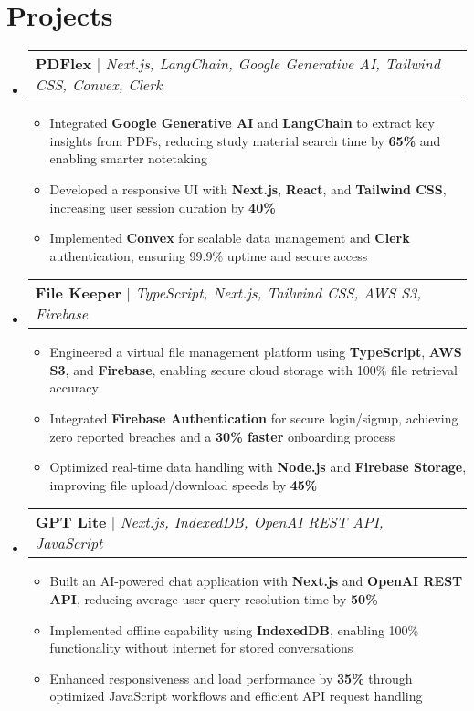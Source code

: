 \documentclass[letterpaper,11pt]{article}
\makeatletter
\newcommand{\resumeItem}[1]{
  \item\small{
    {#1 \vspace{0pt}}
  }
}
\newcommand{\resumeProjectHeading}[2]{
    \item
    \begin{tabular*}{1.001\textwidth}{l@{\extracolsep{\fill}}r}
      \small#1 & \textbf{\small #2}\\
    \end{tabular*}\vspace{-7pt}
}
\newcommand{\resumeSubHeadingListStart}{\begin{itemize}[leftmargin=0.0in, label={}]}
\newcommand{\resumeSubHeadingListEnd}{\end{itemize}}\vspace{0pt}
\newcommand{\resumeItemListStart}{\begin{itemize}}
\newcommand{\resumeItemListEnd}{\end{itemize}\vspace{-5pt}}
\makeatother
\begin{document}
\section{Projects} 
\vspace{-5pt}
\resumeSubHeadingListStart
\resumeProjectHeading
    {\textbf{{PDFlex}} $|$ \emph{Next.js, LangChain, Google Generative AI, Tailwind CSS, Convex, Clerk}}{}
    \resumeItemListStart
        \resumeItem{Integrated \textbf{Google Generative AI} and \textbf{LangChain} to extract key insights from PDFs, reducing study material search time by \textbf{65\%} and enabling smarter notetaking}
        \resumeItem{Developed a responsive UI with \textbf{Next.js}, \textbf{React}, and \textbf{Tailwind CSS}, increasing user session duration by \textbf{40\%}}
        \resumeItem{Implemented \textbf{Convex} for scalable data management and \textbf{Clerk} authentication, ensuring 99.9\% uptime and secure access}
    \resumeItemListEnd
\vspace{-20pt}
\resumeProjectHeading
    {\textbf{{File Keeper}} $|$ \emph{TypeScript, Next.js, Tailwind CSS, AWS S3, Firebase}}{}
    \resumeItemListStart
        \resumeItem{Engineered a virtual file management platform using \textbf{TypeScript}, \textbf{AWS S3}, and \textbf{Firebase}, enabling secure cloud storage with 100\% file retrieval accuracy}
        \resumeItem{Integrated \textbf{Firebase Authentication} for secure login/signup, achieving zero reported breaches and a \textbf{30\% faster} onboarding process}
        \resumeItem{Optimized real-time data handling with \textbf{Node.js} and \textbf{Firebase Storage}, improving file upload/download speeds by \textbf{45\%}}
    \resumeItemListEnd
\vspace{-15pt}
\resumeProjectHeading
    {\textbf{{GPT Lite}} $|$ \emph{Next.js, IndexedDB, OpenAI REST API, JavaScript}}{}
    \resumeItemListStart
        \resumeItem{Built an AI-powered chat application with \textbf{Next.js} and \textbf{OpenAI REST API}, reducing average user query resolution time by \textbf{50\%}}
        \resumeItem{Implemented offline capability using \textbf{IndexedDB}, enabling 100\% functionality without internet for stored conversations}
        \resumeItem{Enhanced responsiveness and load performance by \textbf{35\%} through optimized JavaScript workflows and efficient API request handling}
    \resumeItemListEnd
\resumeSubHeadingListEnd
\vspace{-15pt}
\end{document}

